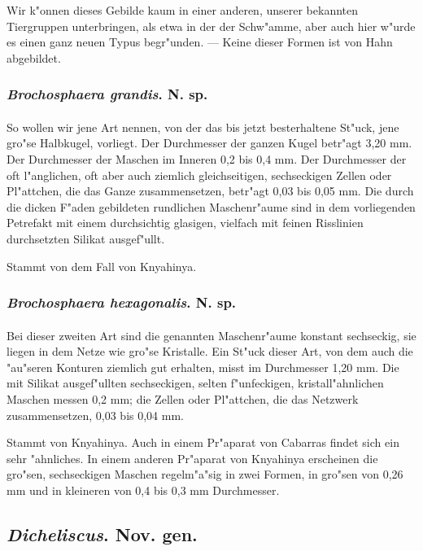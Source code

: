 \documentclass[a4paper, 11pt, oneside]{article}
\begin{document}
Wir k"onnen dieses Gebilde kaum in einer anderen, unserer bekannten Tiergruppen unterbringen, als etwa in der der Schw"amme, aber auch hier w"urde es einen ganz neuen Typus begr"unden. --- Keine dieser Formen ist von Hahn abgebildet.
\subsubsection{\emph{Brochosphaera grandis}. N. sp.}
\paragraph{}
So wollen wir jene Art nennen, von der das bis jetzt besterhaltene St"uck, jene gro"se Halbkugel, vorliegt. Der Durchmesser der ganzen Kugel betr"agt 3,20 mm. Der Durchmesser der Maschen im Inneren 0,2 bis 0,4 mm. Der Durchmesser der oft l"anglichen, oft aber auch ziemlich gleichseitigen, sechseckigen Zellen oder Pl"attchen, die das Ganze zusammensetzen, betr"agt 0,03 bis 0,05 mm. Die durch die dicken F"aden gebildeten rundlichen Maschenr"aume sind in dem vorliegenden Petrefakt mit einem durchsichtig glasigen, vielfach mit feinen Risslinien durchsetzten Silikat ausgef"ullt.

Stammt von dem Fall von Knyahinya.
\subsubsection{\emph{Brochosphaera hexagonalis}. N. sp.}
\paragraph{}
Bei dieser zweiten Art sind die genannten Maschenr"aume konstant sechseckig, sie liegen in dem Netze wie gro"se Kristalle. Ein St"uck dieser Art, von dem auch die "au"seren Konturen ziemlich gut erhalten, misst im Durchmesser 1,20 mm. Die mit Silikat ausgef"ullten sechseckigen, selten f"unfeckigen, kristall"ahnlichen Maschen messen 0,2 mm; die Zellen oder Pl"attchen, die das Netzwerk zusammensetzen, 0,03 bis 0,04 mm.

Stammt von Knyahinya. Auch in einem Pr"aparat von Cabarras findet sich ein sehr "ahnliches. In einem anderen Pr"aparat von Knyahinya erscheinen die gro"sen, sechseckigen Maschen regelm"a"sig in zwei Formen, in gro"sen von 0,26 mm und in kleineren von 0,4 bis 0,3 mm Durchmesser.
\subsection{\emph{Dicheliscus}. Nov. gen.}
\end{document}
